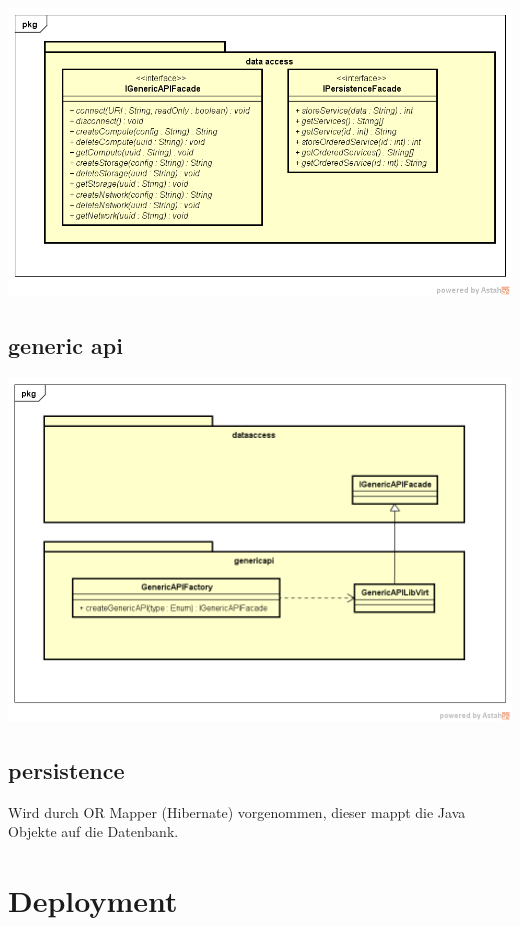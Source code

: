 \documentclass[11pt]{scrartcl}
\begin{document}
\begin{center}
\includegraphics[scale=0.5]{Klassenstruktur-dataaccess}
\end{center}


\subsection{generic api}

\begin{center}
\includegraphics[scale=0.5]{Klassenstruktur-genericapi}
\end{center}

\subsection{persistence}

Wird durch OR Mapper (Hibernate) vorgenommen, dieser mappt die Java Objekte auf 
die Datenbank.

\section{Deployment}
\end{document}
